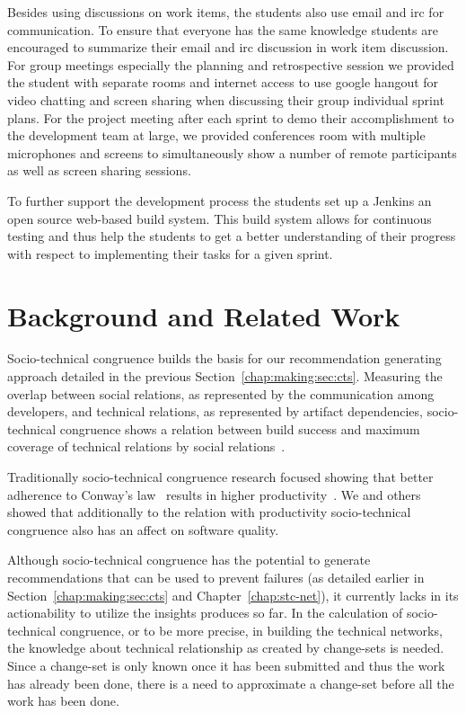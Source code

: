 Besides using discussions on work items, the students also use email and irc for communication.
To ensure that everyone has the same knowledge students are encouraged to summarize their email and irc discussion in work item discussion.
For group meetings especially the planning and retrospective session we provided the student with separate rooms and internet access to use google hangout for video chatting and screen sharing when discussing their group individual sprint plans.
For the project meeting after each sprint to demo their accomplishment to the development team at large, we provided conferences room with multiple microphones and screens to simultaneously show a number of remote participants as well as screen sharing sessions. 

To further support the development process the students set up a Jenkins an open source web-based build system.
This build system allows for continuous testing and thus help the students to get a better understanding of their progress with respect to implementing their tasks for a given sprint.

\section{Background and Related Work}
Socio-technical congruence builds the basis for our recommendation generating approach detailed in the previous Section~\ref{chap:making:sec:cts}.
Measuring the overlap between social relations, as represented by the communication among developers, and technical relations, as represented by artifact dependencies, socio-technical congruence shows a relation between build success and maximum coverage of technical relations by social relations~\cite{}.

Traditionally socio-technical congruence research focused showing that better adherence to Conway's law~\cite{} results in higher productivity~\cite{}.
We and others showed that additionally to the relation with productivity socio-technical congruence also has an affect on software quality.  

Although socio-technical congruence has the potential to generate recommendations that can be used to prevent failures (as detailed earlier in Section~\ref{chap:making:sec:cts} and Chapter~\ref{chap:stc-net}), it currently lacks in its actionability to utilize the insights produces so far.
In the calculation of socio-technical congruence, or to be more precise, in building the technical networks, the knowledge about technical relationship as created by change-sets is needed.
Since a change-set is only known once it has been submitted and thus the work has already been done, there is a need to approximate a change-set before all the work has been done.

